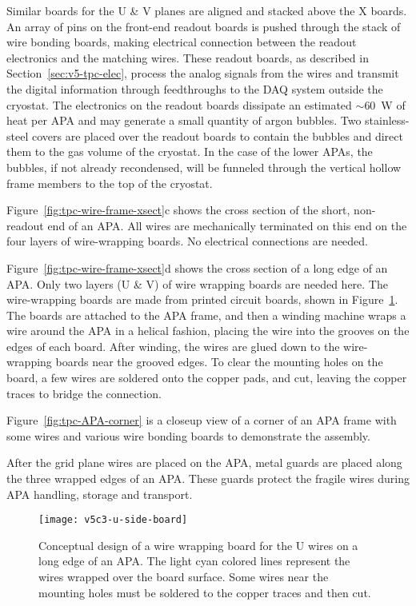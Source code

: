 Similar boards for the U \& V planes are aligned and stacked above the X boards.   An array of pins on the front-end readout boards is pushed through the stack of wire bonding boards, making electrical connection between the readout electronics and the matching wires. These readout boards, as described 
in Section~\ref{sec:v5-tpc-elec}, process the analog signals from the wires and transmit 
the digital information through feedthroughs to the DAQ system outside 
the cryostat.  The electronics on the readout boards dissipate an estimated $\sim$60~W of heat per APA and may generate a small quantity of argon bubbles.
Two stainless-steel covers are placed over the readout boards to contain 
the bubbles and direct them to the gas volume of the cryostat. In the case of the lower APAs, the bubbles, if not already recondensed, will be funneled through the vertical hollow frame members to the top of the cryostat.

Figure~\ref{fig:tpc-wire-frame-xsect}c shows the cross section of the short, non-readout end 
of an APA. All wires are mechanically terminated on this end on the four layers 
of wire-wrapping boards.  No electrical connections are needed. 


Figure~\ref{fig:tpc-wire-frame-xsect}d shows the cross section of a long edge of an APA. 
Only two layers (U \& V) of wire wrapping boards are needed here. The wire-wrapping boards are 
made from printed circuit boards, shown in Figure~\ref{fig:tpc-wire-board-u-side}. The boards are attached to the APA frame, and then a winding machine wraps a wire around the APA in a helical fashion, placing the wire into the grooves on the edges of each board. After winding, the wires are glued down to the wire-wrapping boards near the grooved edges.  To clear the mounting holes on the board, a few wires are soldered onto the copper pads, and cut, leaving the copper traces to bridge the connection.  
 
Figure~\ref{fig:tpc-APA-corner} is a closeup view of a corner of an APA frame with some wires and various wire bonding boards to demonstrate the assembly.
   
After the grid plane wires are placed on the APA,  metal guards are placed along the three wrapped edges of an APA.  These guards protect the fragile wires during APA handling, storage and transport.


\begin{figure}[htpb]
\centering
\texttt{[image: v5c3-u-side-board]}
\caption[Concept of wire wrapping board for U wires on long edge of APA]{Conceptual design of a wire wrapping board for the U wires on a long edge of an APA.  The light cyan colored lines represent the wires wrapped over the board surface.  Some wires near the mounting holes must be soldered to the copper traces and then cut.}
\label{fig:tpc-wire-board-u-side}
\end{figure}


